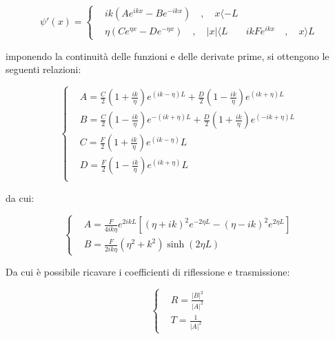 \documentclass{article}
\begin{document}
\begin{equation}
  \psi'(x)=
  \left\{
  \begin{aligned}
     & ik(Ae^{ikx}-Be^{-ikx}) \quad , \quad x\langle -L          \\
     & \eta(Ce^{\eta x}-De^{-\eta x}) \quad , \quad |x|\langle L
     & ikFe^{ikx} \quad , \quad x\rangle L
  \end{aligned}
  \right.
\end{equation}

imponendo la continuità delle funzioni e delle derivate prime, si ottengono le seguenti relazioni:

\begin{equation}
  \left\{
  \begin{aligned}
     & A= \frac{C}{2}\left(1+\frac{ik}{\eta}\right)e^{(ik-\eta)L}+ \frac{D}{2}\left(1-\frac{ik}{\eta}\right)e^{(ik+\eta)L}   \\
     & B= \frac{C}{2}\left(1-\frac{ik}{\eta}\right)e^{-(ik+\eta)L}+ \frac{D}{2}\left(1+\frac{ik}{\eta}\right)e^{(-ik+\eta)L} \\
     & C=\frac{F}{2}\left(1+\frac{ik}{\eta}\right)e^(ik-\eta)L                                                               \\
     & D=\frac{F}{2}\left(1-\frac{ik}{\eta}\right)e^(ik+\eta)L                                                               \\
  \end{aligned}
  \right.
\end{equation}

da cui:

\begin{equation}
  \left\{
  \begin{aligned}
     & A=\frac{F}{4ik\eta}e^{2ikL}\left[(\eta+ik)^2e^{-2\eta L}- (\eta-ik)^2e^{2\eta L}\right] \\
     & B= \frac{F}{2ik\eta}(\eta^2+k^2)\sinh(2\eta L)
  \end{aligned}
  \right.
\end{equation}

Da cui è possibile ricavare i coefficienti di riflessione e trasmissione:

\begin{equation}
  \left\{
  \begin{aligned}
     & R= \frac{|B|^2}{|A|^2} \\
     & T= \frac{1}{|A|^2}
  \end{aligned}
  \right.
\end{equation}
\end{document}
